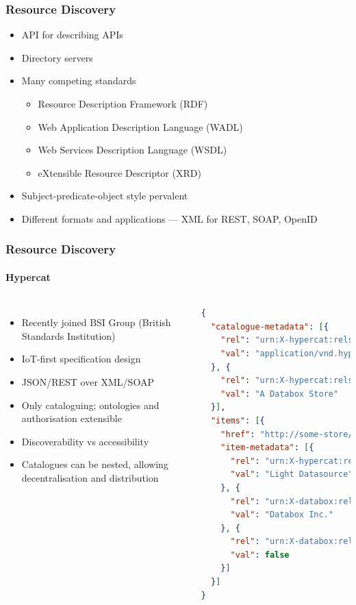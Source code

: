\documentclass[aspectratio=169]{beamer}
\begin{document}
\begin{frame}
	\frametitle{Resource Discovery}
	\begin{itemize}
		\item API for describing APIs
		\item Directory servers
		\item Many competing standards
		\begin{itemize}
			\item Resource Description Framework (RDF)
			\item Web Application Description Language (WADL)
			\item Web Services Description Language (WSDL)
			\item eXtensible Resource Descriptor (XRD)
		\end{itemize}
		\item Subject-predicate-object style pervalent
		\item Different formats and applications --- XML for REST, SOAP, OpenID
	\end{itemize}
\end{frame}

\begin{frame}[fragile]
	\frametitle{Resource Discovery}
	\framesubtitle{Hypercat}
	\begin{columns}[c]
		\begin{itemize}
			\item Recently joined BSI Group (British Standards Institution)
			\item IoT-first specification design
			\item JSON/REST over XML/SOAP
			\item Only cataloguing; ontologies and authorisation extensible
			\item Discoverability vs accessibility
			\item Catalogues can be nested, allowing decentralisation and distribution
		\end{itemize}
		\begin{lstlisting}[language=json,basicstyle=\tiny\ttfamily]
{
  "catalogue-metadata": [{
    "rel": "urn:X-hypercat:rels:isContentType",
    "val": "application/vnd.hypercat.catalogue+json"
  }, {
    "rel": "urn:X-hypercat:rels:hasDescription:en",
    "val": "A Databox Store"
  }],
  "items": [{
    "href": "http://some-store/light",
    "item-metadata": [{
      "rel": "urn:X-hypercat:rels:hasDescription:en",
      "val": "Light Datasource"
    }, {
      "rel": "urn:X-databox:rels:hasVendor",
      "val": "Databox Inc."
    }, {
      "rel": "urn:X-databox:rels:isActuator",
      "val": false
    }]
  }]
}
		\end{lstlisting}
	\end{columns}
\end{frame}
\end{document}
